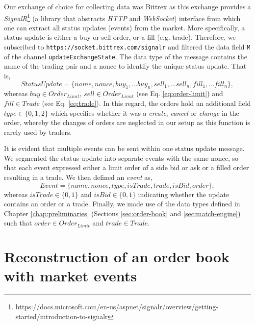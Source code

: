 Our exchange of choice for collecting data was Bittrex as this exchange provides a \textit{SignalR}\footnote{https://docs.microsoft.com/en-us/aspnet/signalr/overview/getting-started/introduction-to-signalr} (a library that abstracts \textit{HTTP} and \textit{WebSocket}) interface from which one can extract all status updates (events) from the market.
More specifically, a status update is either a buy or sell order, or a fill (e.g. trade).
Therefore, we subscribed to \texttt{https://socket.bittrex.com/signalr} and filtered the data field \texttt{M} of the channel \texttt{updateExchangeState}.
The data type of the message contains the name of the trading pair and a nonce to identify the unique status update.
That is,
\begin{equation}
    StatusUpdate = \{name, nonce, buy_1,...buy_n, sell_1,...sell_n, fill_1,...fill_n\},
\end{equation}
whereas $buy \in Order_{Limit}$, $sell \in Order_{Limit}$ (see Eq. \ref{eq:order-limit}) and $fill \in Trade$ (see Eq. \ref{eq:trade}).
In this regard, the orders hold an additional field $type \in \{0,1,2\}$ which specifies whether it was a \textit{create}, \textit{cancel} or \textit{change} in the order, whereby the changes of orders are neglected in our setup as this function is rarely used by traders.

It is evident that multiple events can be sent within one status update message. 
We segmented the status update into separate events with the same nonce, so that each event expressed either a limit order of a side bid or ask or a filled order resulting in a trade.
We then defined an \textit{event} as,
\begin{equation}\label{eq:event-update}
    Event = \{name, nonce, type, isTrade, trade, isBid, order\},
\end{equation}
whereas $isTrade \in \{0,1\}$ and $isBid \in \{0,1\}$ indicating whether the update contains an order or a trade. 
Finally, we made use of the data types defined in Chapter \ref{chap:preliminaries} (Sections \ref{sec:order-book} and \ref{sec:match-engine}) such that $order \in Order_{Limit}$ and $trade \in Trade$.

\section{Reconstruction of an order book with market events}
\label{sec:data-generation}

